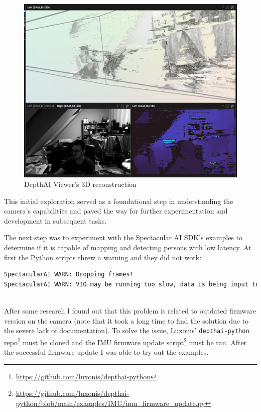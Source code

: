 \begin{figure}[H]
	\centering
	\includegraphics[width=150mm, keepaspectratio]{figures/depthai_viewer_3d.png}
	\caption{DepthAI Viewer's 3D reconstruction}
	\label{fig:DAI_3d}
\end{figure}

This initial exploration served as a foundational step in understanding the camera's capabilities and paved the way for further experimentation and development in subsequent tasks.

The next step was to experiment with the Spectacular AI SDK's examples to determine if it is capable of mapping and detecting persons with low latency. At first the Python scripts threw a warning and they did not work: 
\begin{lstlisting}[language=bash,frame=single,float=!ht]
SpectacularAI WARN: Dropping frames!
SpectacularAI WARN: VIO may be running too slow, data is being input too fast, or IMU samples are missing / time-offset from frames. (buffer size 10)
\end{lstlisting}\\
After some research I found out that this problem is related to outdated firmware version on the camera (note that it took a long time to find the solution due to the severe lack of documentation). To solve the issue, Luxonis' \verb|depthai-python| repo\footnote{\url{https://github.com/luxonis/depthai-python}} must be cloned and the IMU firmware update script\footnote{\url{https://github.com/luxonis/depthai-python/blob/main/examples/IMU/imu_firmware_update.py}} must be ran. After the successful firmware update I was able to try out the examples.

